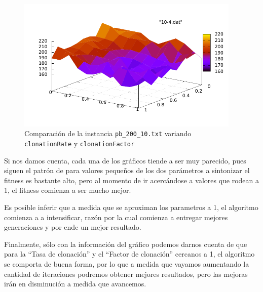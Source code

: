 \newpage 
\begin{figure}[h!]
\begin{center}
	\includegraphics[width=0.95\textwidth]{img/10-4.pdf}
	\caption{Comparaci\'on de la instancia \texttt{pb\_200\_10.txt} variando \texttt{clonationRate} y \texttt{clonationFactor}}
	\label{fig:4-3}
\end{center}
\end{figure}

Si nos damos cuenta, cada una de los gráficos tiende a ser muy parecido,
pues siguen el patrón de para valores pequeños de los dos parámetros a sintonizar
el fitness es bastante alto, pero al momento de ir acercándose a valores que rodean a 1,
el fitness comienza a ser mucho mejor.

Es posible inferir que a medida que se aproximan los parametros a 1, el algoritmo
comienza a a intensificar, razón por la cual comienza a entregar mejores generaciones y por ende
un mejor resultado.

Finalmente, sólo con la información del gráfico podemos darnos cuenta de que
para la ``Tasa de clonación'' y el ``Factor de clonación'' cercanos a 1,
el algoritmo se comporta de buena forma, por lo que a medida que vayamos aumentando
la cantidad de iteraciones podremos obtener mejores resultados, pero las mejoras
irán en disminución a medida que avancemos.

\newpage
%
%
